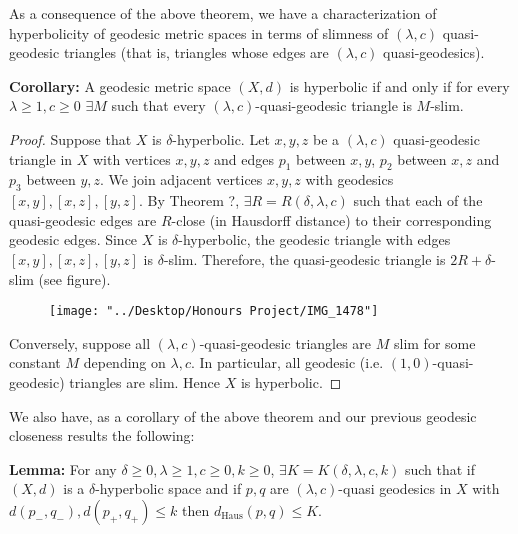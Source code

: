\documentclass[12pt]{article}
\newcommand{\vs}{\vskip10pt}
\begin{document}
	As a consequence of the above theorem, we have a characterization of hyperbolicity of geodesic metric spaces in terms of slimness of $(\lambda, c)$ quasi-geodesic triangles (that is, triangles whose edges are $(\lambda, c)$ quasi-geodesics). 
	
	\vs 
	
	\textbf{Corollary: } A geodesic metric space $(X,d)$ is hyperbolic if and only if for every $\lambda \geq 1, c \geq 0$ $\exists M$ such that every $(\lambda, c)$-quasi-geodesic triangle is $M$-slim. 
	
	\vs 
	
	\begin{proof}
		
		Suppose that $X$ is $\delta$-hyperbolic. Let $x,y,z$ be a $(\lambda, c)$ quasi-geodesic triangle in $X$ with vertices $x,y,z$ and edges $p_1$ between $x,y$, $p_2$ between $x,z$ and $p_3$ between $y,z$. We join adjacent vertices $x,y,z$ with geodesics $[x,y], [x,z], [y,z]$. By Theorem ?, $\exists R = R(\delta, \lambda, c)$ such that each of the quasi-geodesic edges are $R$-close (in Hausdorff distance) to their corresponding geodesic edges. Since $X$ is $\delta$-hyperbolic, the geodesic triangle with edges $[x,y], [x,z], [y,z]$ is $\delta$-slim. Therefore, the quasi-geodesic triangle is $2R + \delta$-slim (see figure). 
		
		
\begin{figure} [h]
	\centering
	\texttt{[image: "../Desktop/Honours Project/IMG\_1478"]}
	\caption{}
	\label{fig:img1478}
\end{figure}
		
		Conversely, suppose all $(\lambda, c)$-quasi-geodesic triangles are $M$ slim for some constant $M$ depending on $\lambda, c$. In particular, all geodesic (i.e. $(1,0)$-quasi-geodesic) triangles are slim. Hence $X$ is hyperbolic.  
	\end{proof}

	We also have, as a corollary of the above theorem and our previous geodesic closeness results the following: 
	
	\vs 
	
	\textbf{Lemma: } For any $\delta \geq 0, \lambda \geq 1, c \geq 0, k \geq 0$, $\exists K = K(\delta, \lambda, c, k)$ such that if $(X,d)$ is a $\delta$-hyperbolic space and if $p,q$ are $(\lambda, c)$-quasi geodesics in $X$ with $d(p_-, q_-), d(p_+, q_+) \leq k$ then $d_{\text{Haus}}(p,q) \leq K$. 
	
\end{document}
